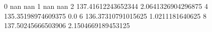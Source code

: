 0 nan nan
1 nan nan
2 137.41612243652344 2.0641326904296875
4 135.35198974609375 0.0
6 136.37310791015625 1.0211181640625
8 137.50245666503906 2.1504669189453125
